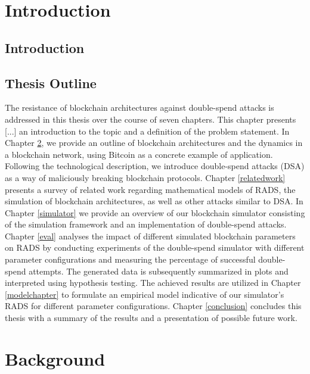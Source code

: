 \documentclass[a4paper,12pt,twoside]{report}
\begin{document}

\fancyhead{}
\pagestyle{fancy}
\fancyhead[LE]{\slshape \leftmark}
\fancyhead[RO]{\slshape \rightmark}
\headheight=15pt





\chapter{Introduction}\label{intro}
\section{Introduction}
\section{Thesis Outline}
The resistance of blockchain architectures against double-spend attacks is addressed in this thesis over the course of seven chapters. This chapter presents [...] an introduction to the topic and a definition of the problem statement. In Chapter \ref{background}, we provide an outline of blockchain architectures and the dynamics in a blockchain network, using Bitcoin as a concrete example of application. Following the technological description, we introduce double-spend attacks (DSA) as a way of maliciously breaking blockchain protocols. Chapter \ref{relatedwork} presents a survey of related work regarding mathematical models of RADS, the simulation of blockchain architectures, as well as other attacks similar to DSA. In Chapter \ref{simulator} we provide an overview of our blockchain simulator consisting of the simulation framework and an implementation of double-spend attacks. Chapter \ref{eval} analyses the impact of different simulated blockchain parameters on RADS by conducting experiments of the double-spend simulator with different parameter configurations and measuring the percentage of successful double-spend attempts. The generated data is subsequently summarized in plots and interpreted using hypothesis testing. The achieved results are utilized in Chapter \ref{modelchapter} to formulate an empirical model indicative of our simulator's RADS for different parameter configurations. Chapter \ref{conclusion} concludes this thesis with a summary of the results and a presentation of possible future work.


\chapter{Background} \label{background}
\end{document}
